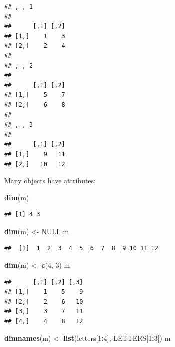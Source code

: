 \documentclass[12pt,]{book}
\newenvironment{Shaded}{\begin{snugshade}}{\end{snugshade}}
\newcommand{\DecValTok}[1]{\textcolor[rgb]{0.00,0.00,0.81}{#1}}
\newcommand{\KeywordTok}[1]{\textcolor[rgb]{0.13,0.29,0.53}{\textbf{#1}}}
\newcommand{\NormalTok}[1]{#1}
\newcommand{\OperatorTok}[1]{\textcolor[rgb]{0.81,0.36,0.00}{\textbf{#1}}}
\newcommand{\OtherTok}[1]{\textcolor[rgb]{0.56,0.35,0.01}{#1}}
\newcommand{\StringTok}[1]{\textcolor[rgb]{0.31,0.60,0.02}{#1}}
\begin{document}
\begin{verbatim}
## , , 1
## 
##      [,1] [,2]
## [1,]    1    3
## [2,]    2    4
## 
## , , 2
## 
##      [,1] [,2]
## [1,]    5    7
## [2,]    6    8
## 
## , , 3
## 
##      [,1] [,2]
## [1,]    9   11
## [2,]   10   12
\end{verbatim}

Many objects have attributes:

\begin{Shaded}
\begin{Highlighting}[]
\KeywordTok{dim}\NormalTok{(m)}
\end{Highlighting}
\end{Shaded}

\begin{verbatim}
## [1] 4 3
\end{verbatim}

\begin{Shaded}
\begin{Highlighting}[]
\KeywordTok{dim}\NormalTok{(m) <-}\StringTok{ }\OtherTok{NULL}
\NormalTok{m}
\end{Highlighting}
\end{Shaded}

\begin{verbatim}
##  [1]  1  2  3  4  5  6  7  8  9 10 11 12
\end{verbatim}

\begin{Shaded}
\begin{Highlighting}[]
\KeywordTok{dim}\NormalTok{(m) <-}\StringTok{ }\KeywordTok{c}\NormalTok{(}\DecValTok{4}\NormalTok{, }\DecValTok{3}\NormalTok{)}
\NormalTok{m}
\end{Highlighting}
\end{Shaded}

\begin{verbatim}
##      [,1] [,2] [,3]
## [1,]    1    5    9
## [2,]    2    6   10
## [3,]    3    7   11
## [4,]    4    8   12
\end{verbatim}

\begin{Shaded}
\begin{Highlighting}[]
\KeywordTok{dimnames}\NormalTok{(m) <-}\StringTok{ }\KeywordTok{list}\NormalTok{(letters[}\DecValTok{1}\OperatorTok{:}\DecValTok{4}\NormalTok{], LETTERS[}\DecValTok{1}\OperatorTok{:}\DecValTok{3}\NormalTok{])}
\NormalTok{m}
\end{Highlighting}
\end{Shaded}
\end{document}
